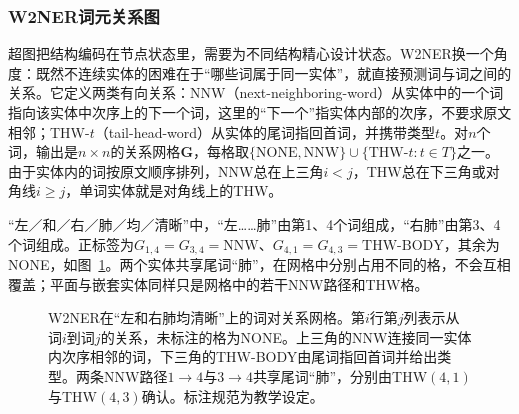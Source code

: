 \subsubsection{W2NER词元关系图}
\label{sec:nlp-extraction-w2ner}

超图把结构编码在节点状态里，需要为不同结构精心设计状态。W2NER换一个角度：既然不连续实体的困难在于“哪些词属于同一实体”，就直接预测词与词之间的关系。它定义两类有向关系：NNW（next-neighboring-word）从实体中的一个词指向该实体中次序上的下一个词，这里的“下一个”指实体内部的次序，不要求原文相邻；THW-$t$（tail-head-word）从实体的尾词指回首词，并携带类型$t$。对$n$个词，输出是$n\times n$的关系网格$\bm G$，每格取$\{\mathrm{NONE},\mathrm{NNW}\}\cup\{\mathrm{THW}\text{-}t:t\in T\}$之一。由于实体内的词按原文顺序排列，NNW总在上三角$i<j$，THW总在下三角或对角线$i\geq j$，单词实体就是对角线上的THW。

“左／和／右／肺／均／清晰”中，“左……肺”由第1、4个词组成，“右肺”由第3、4个词组成。正标签为$G_{1,4}=G_{3,4}=\mathrm{NNW}$、$G_{4,1}=G_{4,3}=\mathrm{THW}\text{-}\mathrm{BODY}$，其余为NONE，如图~\ref{fig:nlp-extraction-w2ner-grid}。两个实体共享尾词“肺”，在网格中分别占用不同的格，不会互相覆盖；平面与嵌套实体同样只是网格中的若干NNW路径和THW格。

\begin{figure}[htbp]
  \centering
  
  \caption{W2NER在“左和右肺均清晰”上的词对关系网格。第$i$行第$j$列表示从词$i$到词$j$的关系，未标注的格为NONE。上三角的NNW连接同一实体内次序相邻的词，下三角的THW-BODY由尾词指回首词并给出类型。两条NNW路径$1\to4$与$3\to4$共享尾词“肺”，分别由THW$(4,1)$与THW$(4,3)$确认。标注规范为教学设定。}
  \label{fig:nlp-extraction-w2ner-grid}
\end{figure}

